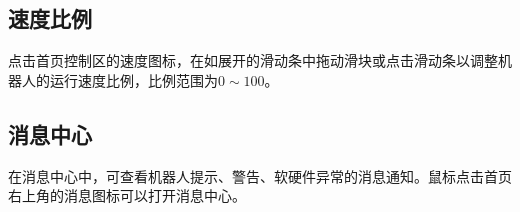 
\subsection{速度比例}
点击\LM 首页控制区的速度图标，在如展开的滑动条中拖动滑块或点击滑动条以调整机器人的运行速度比例，比例范围为$0\sim 100$。 

\subsection{消息中心}
在消息中心中，可查看机器人提示、警告、软硬件异常的消息通知。鼠标点击\LM 首页右上角的消息图标\colorbox{black}{}可以打开消息中心。

